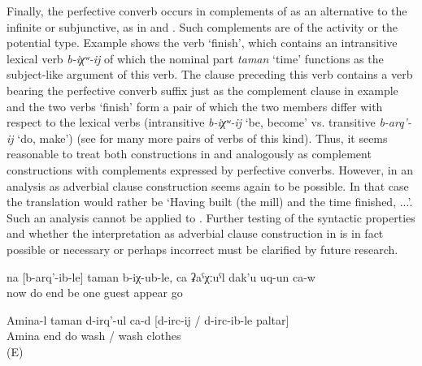 Finally, the perfective converb occurs in complements of  as an alternative to the infinite or subjunctive, as in  and . Such complements are of the activity or the potential type. Example  shows the verb `finish', which contains an intransitive lexical verb \textit{b-iχʷ-ij} of which the nominal part \textit{taman} `time' functions as the subject-like argument of this verb. The clause preceding this verb contains a verb bearing the perfective converb suffix just as the complement clause in example  and the two verbs `finish' form a pair of which the two members differ with respect to the lexical verbs (intransitive \textit{b-iχʷ-ij} `be, become' vs. transitive \textit{b-arq'-ij} `do, make') (see  for many more pairs of verbs of this kind). Thus, it seems reasonable to treat both constructions in  and  analogously as complement constructions with complements expressed by perfective converbs. However, in   an analysis as adverbial clause construction seems again to be possible. In that case the translation would rather be `Having built (the mill) and the time finished, ...'. Such an analysis cannot be applied to . Further testing of the syntactic properties and whether the interpretation as adverbial clause construction in  is in fact possible or necessary or perhaps incorrect must be clarified by future research.
%
\begin{exe}

	\ex	\label{ex:‎When they finished building, a man appeared}
	\gll	na	[b-arq'-ib-le]	taman	b-iχ-ub-le,	ca	ʡaˁχːuˁl	dak'u	uq-un	ca-w\\
		now	do	end	be	one	guest	appear	go	\\
	\glt	{}
	
	\ex	\label{ex:Aminat finished to wash / washing the clothes}
	\gll	Amina-l taman d-irq'-ul ca-d	 [d-irc-ij	/	d-irc-ib-le	paltar]\\
		Amina	end	do	 wash	/  wash clothes\\
	\glt	{} (E)
\end{exe}


